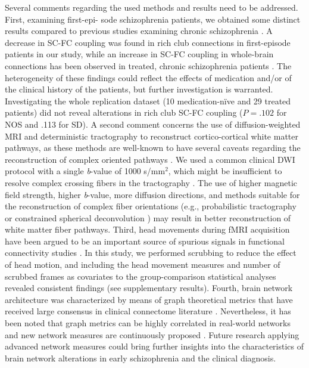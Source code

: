 \begin{refsection}
Several comments regarding the used methods and results need to be addressed. First, examining first-epi- sode schizophrenia patients, we obtained some distinct results compared to previous studies examining chronic schizophrenia \citep{vanDenHeuvel2013AbnormalRC,Yeo2016GraphMO,Klauser2017WhiteMD}. A decrease in SC-FC coupling was found in rich club connections in first-episode patients in our study, while an increase in SC-FC coupling in whole-brain connections has been observed in treated, chronic schizophrenia patients \citep{vanDenHeuvel2013AbnormalRC}. The heterogeneity of these findings could reflect the effects of medication and/or of the clinical history of the patients, but further investigation is warranted. Investigating the whole replication dataset (10 medication-n\"{i}ve and 29 treated patients) did not reveal alterations in rich club SC-FC coupling ($P = .102$ for NOS and .113 for SD). A second comment concerns the use of diffusion-weighted MRI and deterministic tractography to reconstruct cortico-cortical white matter pathways, as these methods are well-known to have several caveats regarding the reconstruction of complex oriented pathways \citep{Jbabdi2011TractographyWD}. We used a common clinical DWI protocol with a single \textit{b}-value of 1000 s/mm$^{2}$, which might be insufficient to resolve complex crossing fibers in the tractography \citep{Weiss2015ImprovedNA,Tournier2007RobustDO,Tournier2004DirectEO}. The use of higher magnetic field strength, higher \textit{b}-value, more diffusion directions, and methods suitable for the reconstruction of complex fiber orientations (e.g., probabilistic tractography \citep{Behrens2007ProbabilisticDT} or constrained spherical deconvolution \citep{Tournier2007RobustDO,Tournier2004DirectEO}) may result in better reconstruction of white matter fiber pathways. Third, head movements during fMRI acquisition have been argued to be an important source of spurious signals in functional connectivity studies \citep{Power2012SpuriousBS,Yan2013ACA}. In this study, we performed scrubbing to reduce the effect of head motion, and including the head movement measures and number of scrubbed frames as covariates to the group-comparison statistical analyses revealed consistent findings (see supplementary results). Fourth, brain network architecture was characterized by means of graph theoretical metrics that have received large consensus in clinical connectome literature \citep{Fornito2012SchizophreniaNA,Heuvel2014BrainNI,Griffa2013StructuralCI,Fornito2015ConnectomicsAN}. Nevertheless, it has been noted that graph metrics can be highly correlated in real-world networks \citep{sporns_human_2005} and new network measures are continuously proposed \citep{Bertolero2017TheDC,Betzel2017MultiscaleBN}. Future research applying advanced network measures could bring further insights into the characteristics of brain network alterations in early schizophrenia and the clinical diagnosis.\\


\end{refsection}
